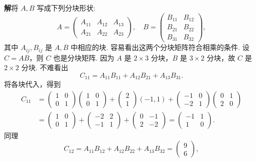 \documentclass[UTF8, 12pt, fontset=fandol, oneside]{ctexart}
\begin{document}
\noindent\textbf{解}\quad 将 $A,B$ 写成下列分块形状:
\[
A=\left(\begin{array}{ccc}
A_{11} & A_{12} & A_{13}\\
A_{21} & A_{22} & A_{23}
\end{array}\right),\quad
B=\left(\begin{array}{cc}
B_{11} & B_{12}\\
B_{21} & B_{22}\\
B_{31} & B_{32}
\end{array}\right),
\]
其中 $A_{ij},B_{ij}$ 是 $A,B$ 中相应的块. 容易看出这两个分块矩阵符合相乘的条件. 设 $C=AB$，则 $C$ 也是分块矩阵. 因为 $A$ 是 $2\times 3$ 分块，$B$ 是 $3\times 2$ 分块，故 $C$ 是 $2\times 2$ 分块. 不难看出
\[
C_{11}=A_{11}B_{11}+A_{12}B_{21}+A_{13}B_{31}.
\]
将各块代入，得到
\[
\begin{aligned}
C_{11}
&=\left(\begin{array}{cc}
1 & 0\\
0 & 1
\end{array}\right)
\left(\begin{array}{cc}
1 & 0\\
0 & 1
\end{array}\right)
+\left(\begin{array}{c}
2\\
1
\end{array}\right)(-1,1)
+\left(\begin{array}{rr}
-1 & 0\\
-2 & 1
\end{array}\right)
\left(\begin{array}{cc}
0 & 1\\
2 & 0
\end{array}\right)\\
&=\left(\begin{array}{cc}
1 & 0\\
0 & 1
\end{array}\right)
+\left(\begin{array}{rr}
-2 & 2\\
-1 & 1
\end{array}\right)
+\left(\begin{array}{rr}
0 & -1\\
2 & -2
\end{array}\right)
=\left(\begin{array}{rr}
-1 & 1\\
1 & 0
\end{array}\right).
\end{aligned}
\]
同理
\[
C_{12}=A_{11}B_{12}+A_{12}B_{22}+A_{13}B_{32}=\left(\begin{array}{c}
9\\
6
\end{array}\right),
\]
\end{document}
